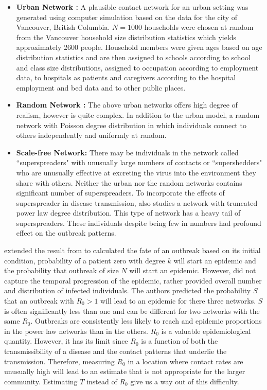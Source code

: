 \documentclass[12pt, journal,onecolumn]{IEEEtran}
\begin{document}
\begin{itemize}
\item \textbf{Urban Network : }  A plausible contact network for an urban setting was generated using computer simulation based on the data for the city of Vancouver, British Columbia. $N=1000$ households were chosen at random from the Vancouver household size distribution statistics which yields approximately 2600 people. Household members were given ages based on age distribution statistics and are then assigned to schools according to school and class size distributions, assigned to occupation according to employment data, to hospitals as patients and caregivers according to the hospital employment and bed data and to other public places. 
\item \textbf{Random Network : } The above urban networks offers high degree of realism, however is quite complex. In addition to the urban model, a random network with Poisson degree distribution in which individuals connect to others independently and uniformly at random. 
\item \textbf{Scale-free Network: } There may be individuals in the network called ``superspreaders" with unusually large numbers of contacts or ``supershedders" who are unusually effective at excreting the virus into the environment they share with others. Neither the urban nor the random networks contains significant number of superspreaders. To incorporate the effects of superspreader in disease transmission, \cite{meyers2005network} also studies a network with truncated power law degree distribution. This type of network has a heavy tail of superspreaders. These individuals despite being few in numbers had profound effect on the outbreak patterns. 
\end{itemize}
 
 \cite{meyers2005network} extended the result from \cite{newman2002spread} to calculated the fate of an outbreak based on its initial condition, probability of a patient zero with degree $k$ will start an epidemic and the probability that outbreak of size $N$ will start an epidemic. However, \cite{newman2002spread} did not capture the temporal progression of the epidemic, rather provided overall number and distribution of infected individuals. The authors predicted the probability $S$ that an outbreak with $R_0>1$ will lead to an epidemic for there three networks. $S$ is often significantly less than one and can be different for two networks with the same $R_0$. Outbreaks are consistently less likely to reach and epidemic proportions in the power law networks than in the others. $R_0$ is a valuable epidemiological quantity. However, it has its limit since $R_0$ is a function of both the transmissibility of a disease and the contact patterns that underlie the transmission. Therefore, measuring $R_0$ in a location where contact rates are unusually high will lead to an estimate that is not appropriate for the larger community.  Estimating $T$ instead of $R_0$ give us a way out of this difficulty. 
\end{document}
